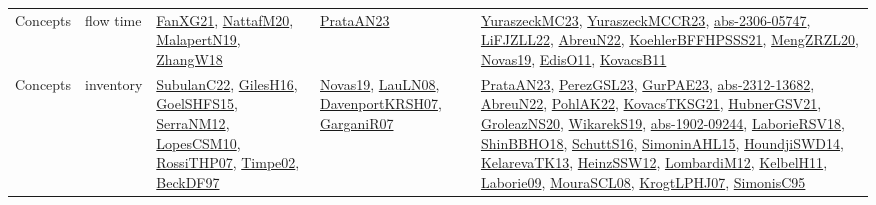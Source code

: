 {\begin{longtable}{llp{6cm}p{6cm}p{6cm}}
Concepts & flow time & \href{articles/FanXG21.pdf}{FanXG21}\cite{FanXG21}, \href{papers/NattafM20.pdf}{NattafM20}\cite{NattafM20}, \href{papers/MalapertN19.pdf}{MalapertN19}\cite{MalapertN19}, \href{articles/ZhangW18.pdf}{ZhangW18}\cite{ZhangW18} & \href{articles/PrataAN23.pdf}{PrataAN23}\cite{PrataAN23} & \href{papers/YuraszeckMC23.pdf}{YuraszeckMC23}\cite{YuraszeckMC23}, \href{articles/YuraszeckMCCR23.pdf}{YuraszeckMCCR23}\cite{YuraszeckMCCR23}, \href{articles/abs-2306-05747.pdf}{abs-2306-05747}\cite{abs-2306-05747}, \href{papers/LiFJZLL22.pdf}{LiFJZLL22}\cite{LiFJZLL22}, \href{articles/AbreuN22.pdf}{AbreuN22}\cite{AbreuN22}, \href{articles/KoehlerBFFHPSSS21.pdf}{KoehlerBFFHPSSS21}\cite{KoehlerBFFHPSSS21}, \href{articles/MengZRZL20.pdf}{MengZRZL20}\cite{MengZRZL20}, \href{articles/Novas19.pdf}{Novas19}\cite{Novas19}, \href{papers/EdisO11.pdf}{EdisO11}\cite{EdisO11}, \href{articles/KovacsB11.pdf}{KovacsB11}\cite{KovacsB11}\\
Concepts & inventory & \href{articles/SubulanC22.pdf}{SubulanC22}\cite{SubulanC22}, \href{papers/GilesH16.pdf}{GilesH16}\cite{GilesH16}, \href{articles/GoelSHFS15.pdf}{GoelSHFS15}\cite{GoelSHFS15}, \href{papers/SerraNM12.pdf}{SerraNM12}\cite{SerraNM12}, \href{articles/LopesCSM10.pdf}{LopesCSM10}\cite{LopesCSM10}, \href{papers/RossiTHP07.pdf}{RossiTHP07}\cite{RossiTHP07}, \href{articles/Timpe02.pdf}{Timpe02}\cite{Timpe02}, \href{papers/BeckDF97.pdf}{BeckDF97}\cite{BeckDF97} & \href{articles/Novas19.pdf}{Novas19}\cite{Novas19}, \href{papers/LauLN08.pdf}{LauLN08}\cite{LauLN08}, \href{papers/DavenportKRSH07.pdf}{DavenportKRSH07}\cite{DavenportKRSH07}, \href{papers/GarganiR07.pdf}{GarganiR07}\cite{GarganiR07} & \href{articles/PrataAN23.pdf}{PrataAN23}\cite{PrataAN23}, \href{papers/PerezGSL23.pdf}{PerezGSL23}\cite{PerezGSL23}, \href{articles/GurPAE23.pdf}{GurPAE23}\cite{GurPAE23}, \href{articles/abs-2312-13682.pdf}{abs-2312-13682}\cite{abs-2312-13682}, \href{articles/AbreuN22.pdf}{AbreuN22}\cite{AbreuN22}, \href{articles/PohlAK22.pdf}{PohlAK22}\cite{PohlAK22}, \href{papers/KovacsTKSG21.pdf}{KovacsTKSG21}\cite{KovacsTKSG21}, \href{articles/HubnerGSV21.pdf}{HubnerGSV21}\cite{HubnerGSV21}, \href{papers/GroleazNS20.pdf}{GroleazNS20}\cite{GroleazNS20}, \href{articles/WikarekS19.pdf}{WikarekS19}\cite{WikarekS19}, \href{articles/abs-1902-09244.pdf}{abs-1902-09244}\cite{abs-1902-09244}, \href{articles/LaborieRSV18.pdf}{LaborieRSV18}\cite{LaborieRSV18}, \href{articles/ShinBBHO18.pdf}{ShinBBHO18}\cite{ShinBBHO18}, \href{papers/SchuttS16.pdf}{SchuttS16}\cite{SchuttS16}, \href{articles/SimoninAHL15.pdf}{SimoninAHL15}\cite{SimoninAHL15}, \href{papers/HoundjiSWD14.pdf}{HoundjiSWD14}\cite{HoundjiSWD14}, \href{papers/KelarevaTK13.pdf}{KelarevaTK13}\cite{KelarevaTK13}, \href{articles/HeinzSSW12.pdf}{HeinzSSW12}\cite{HeinzSSW12}, \href{articles/LombardiM12.pdf}{LombardiM12}\cite{LombardiM12}, \href{articles/KelbelH11.pdf}{KelbelH11}\cite{KelbelH11}, \href{papers/Laborie09.pdf}{Laborie09}\cite{Laborie09}, \href{papers/MouraSCL08.pdf}{MouraSCL08}\cite{MouraSCL08}, \href{papers/KrogtLPHJ07.pdf}{KrogtLPHJ07}\cite{KrogtLPHJ07}, \href{papers/SimonisC95.pdf}{SimonisC95}\cite{SimonisC95}\\

\end{longtable}}
